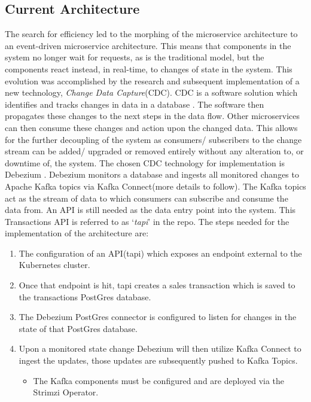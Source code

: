 \begin{flushleft}
	\subsection{Current Architecture}
	The search for efficiency led to the morphing of the microservice architecture to an event-driven \autocite{WhatEventdrivenArchitecture} microservice architecture. This means that components
	in the system no longer wait for requests, as is the traditional model, but the components react instead, in real-time, to changes of state in the system.
	This evolution was accomplished by the research and subsequent implementation of a new technology, \emph{Change Data Capture}(CDC).
	\bigbreak
	CDC is a software solution which identifies and tracks changes in data in a database \autocite{kutayChangeDataCapture2021}. The software then propagates these changes to the next steps in
	the data flow. Other microservices can then consume these changes and action upon the changed data. This allows for the further decoupling of the system as consumers/ subscribers to the
	change stream can be added/ upgraded or removed entirely without any alteration to, or downtime of, the system.
	\bigbreak
	The chosen CDC technology for implementation is Debezium \autocite{debeziumcommunityDebezium}. Debezium monitors a database and ingests all monitored changes to Apache Kafka \autocite{ApacheKafka}
	topics via Kafka Connect(more details to follow). The Kafka topics act as the stream of data to which consumers can subscribe and consume the data from.
	\bigbreak
	An API is still needed as the data entry point into the system. This Transactions API is referred to as `\emph{tapi}' in the repo.
	The steps needed for the implementation of the architecture are:
	\begin{enumerate}
		\item The configuration of an API(tapi) which exposes an endpoint external to the Kubernetes cluster.
		\item Once that endpoint is hit, tapi creates a sales transaction which is saved to the transactions PostGres database.
		\item The Debezium PostGres connector is configured to listen for changes in the state of that PostGres database.
		\item Upon a monitored state change Debezium will then utilize Kafka Connect to ingest the updates, those updates are subsequently pushed to Kafka Topics.
		\begin{itemize}
			\item The Kafka components must be configured and are deployed via the Strimzi Operator.

\end{itemize}
\end{enumerate}
\end{flushleft}
